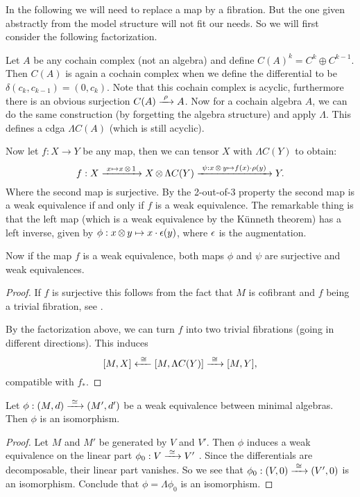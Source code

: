 In the following we will need to replace a map by a fibration. But the one given abstractly from the model structure will not fit our needs. So we will first consider the following factorization.

Let $A$ be any cochain complex (not an algebra) and define $C(A)^k = C^k \oplus C^{k-1}$. Then $C(A)$ is again a cochain complex when we define the differential to be $\delta(c_k, c_{k-1}) = (0, c_k)$. Note that this cochain complex is acyclic, furthermore there is an obvious surjection $C(A) \xrightarrow{\,\,{\rho}\,\,} A$. Now for a cochain algebra $A$, we can do the same construction (by forgetting the algebra structure) and apply $\Lambda$. This defines a cdga $\Lambda C(A)$ (which is still acyclic).

Now let $f: X \to Y$ be any map, then we can tensor $X$ with $\Lambda C(Y)$ to obtain:
$$ f: X \xrightarrow{\,\,{x \mapsto x \operatorname*{\otimes} 1}\,\,} X \operatorname*{\otimes} \Lambda C(Y) \xrightarrow{\,\,{\psi: x \operatorname*{\otimes} y \mapsto f(x) \cdot \rho (y)}\,\,} Y. $$
Where the second map is surjective. By the 2-out-of-3 property the second map is a weak equivalence if and only if $f$ is a weak equivalence. The remarkable thing is that the left map (which is a weak equivalence by the Künneth theorem) has a left inverse, given by $\phi: x \operatorname*{\otimes} y \mapsto x \cdot \epsilon (y)$, where $\epsilon$ is the augmentation.

Now if the map $f$ is a weak equivalence, both maps $\phi$ and $\psi$ are surjective and weak equivalences.

\begin{proof}
	If $f$ is surjective this follows from the fact that $M$ is cofibrant and $f$ being a trivial fibration, see .

	By the factorization above, we can turn $f$ into two trivial fibrations (going in different directions). This induces
	$$ [M, X] \xleftarrow{\,\,{\cong}\,\,} [M, \Lambda C(Y)] \xrightarrow{\,\,{\cong}\,\,} [M, Y], $$
	compatible with $f_\ast$.
\end{proof}

\begin{lemma}
	Let $\phi: (M, d) \xrightarrow{\,\,{\simeq}\,\,} (M', d')$ be a weak equivalence between minimal algebras. Then $\phi$ is an isomorphism.
\end{lemma}
\begin{proof}
	 Let $M$ and $M'$ be generated by $V$ and $V'$. Then $\phi$ induces a weak equivalence on the linear part $\phi_0: V \xrightarrow{\,\,{\simeq}\,\,} V'$ \cite[Theorem 1.5.2]{loday}. Since the differentials are decomposable, their linear part vanishes. So we see that $\phi_0: (V, 0) \xrightarrow{\,\,{\cong}\,\,} (V', 0)$ is an isomorphism.
	Conclude that $\phi = \Lambda \phi_0$ is an isomorphism.
\end{proof}

